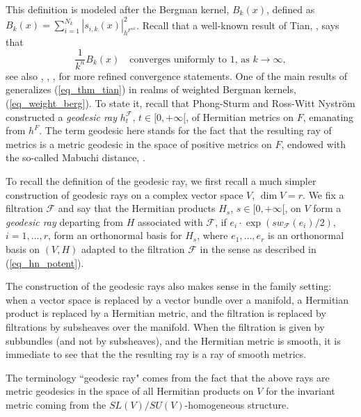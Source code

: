\documentclass[12pt]{article}
\numberwithin{equation}{section}
\theoremstyle{theorem}
\theoremstyle{definition}
\theoremstyle{remark}
\begin{document}
	\par 
	\begin{sloppypar}
	This definition is modeled after the Bergman kernel, $B_k(x)$, defined as $B_k(x) = \sum_{i = 1}^{N_k} |s_{i, k}(x)|_{h^{F^{\otimes k}}}^2$.
	Recall that a well-known result of Tian, \cite{TianBerg}, says that 
	\begin{equation}\label{eq_thm_tian}
		\frac{1}{k^n} B_k(x) \quad \text{converges uniformly to 1, as } k \to \infty,
	\end{equation}
	see also \cite{ZeldBerg}, \cite{Caltin}, \cite{Bouche}, \cite{MaHol} for more refined convergence statements.
	One of the main results of \cite{FinSubmToepl} generalizes (\ref{eq_thm_tian}) in realms of weighted Bergman kernels, (\ref{eq_weight_berg}).
	To state it, recall that Phong-Sturm \cite[Theorem 3]{PhongSturmDirMA} and Ross-Witt Nystr{\"o}m \cite{RossNystAnalTConf} constructed a \textit{geodesic ray} $h^{\mathcal{F}}_t$, $t \in [0, +\infty[$, of Hermitian metrics on $F$, emanating from $h^F$.
	The term geodesic here stands for the fact that the resulting ray of metrics is a metric geodesic in the space of positive metrics on $F$, endowed with the so-called Mabuchi distance, \cite{Mabuchi}.
	\end{sloppypar}
	\par 
	To recall the definition of the geodesic ray, we first recall a much simpler construction of geodesic rays on a complex vector space $V$, $\dim V = r$. 
	We fix a filtration $\mathcal{F}$ and say that the Hermitian products $H_s$, $s \in [0, +\infty[$, on $V$ form a \textit{geodesic ray} departing from $H$ associated with $\mathcal{F}$, if $e_i \cdot \exp(s w_{\mathcal{F}}(e_i) / 2)$, $i = 1, \ldots, r$, form an orthonormal basis for $H_s$, where $e_1, \ldots, e_r$ is an orthonormal basis on $(V, H)$ adapted to the filtration $\mathcal{F}$ in the sense as described in (\ref{eq_hn_potent}).
	\par 
	The construction of the geodesic rays also makes sense in the family setting: when a vector space is replaced by a vector bundle over a manifold, a Hermitian product is replaced by a Hermitian metric, and the filtration is replaced by filtrations by subsheaves over the manifold. 
	When the filtration is given by subbundles (and not by subsheaves), and the Hermitian metric is smooth, it is immediate to see that the the resulting ray is a ray of smooth metrics.
	\par 
	The terminology “geodesic ray" comes from the fact that the above rays are metric geodesics in the space of all Hermitian products on $V$ for the invariant metric coming from the $SL(V) / SU(V)$-homogeneous structure.
\end{document}

